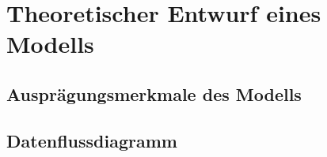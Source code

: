 \newpage
\section{Theoretischer Entwurf eines Modells}
\subsection{Ausprägungsmerkmale des Modells}
\subsection{Datenflussdiagramm}